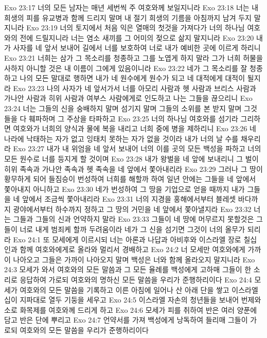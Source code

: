 Exo 23:17  너의 모든 남자는 매년 세번씩 주 여호와께 보일지니라
Exo 23:18  너는 내 희생의 피를 유교병과 함께 드리지 말며 내 절기 희생의 기름을 아침까지 남겨 두지 말지니라
Exo 23:19  너의 토지에서 처음 익은 열매의 첫것을 가져다가 너의 하나님 여호와의 전에 드릴지니라 너는 염소 새끼를 그 어미의 젖으로 삶지 말지니라
Exo 23:20  내가 사자를 네 앞서 보내어 길에서 너를 보호하여 너로 내가 예비한 곳에 이르게 하리니
Exo 23:21  너희는 삼가 그 목소리를 청종하고 그를 노엽게 하지 말라 그가 너희 허물을 사하지 아니할 것은 내 이름이 그에게 있음이니라
Exo 23:22  네가 그 목소리를 잘 청종하고 나의 모든 말대로 행하면 내가 네 원수에게 원수가 되고 네 대적에게 대적이 될지라
Exo 23:23  나의 사자가 네 앞서가서 너를 아모리 사람과 헷 사람과 브리스 사람과 가나안 사람과 히위 사람과 여부스 사람에게로 인도하고 나는 그들을 끊으리니
Exo 23:24  너는 그들의 신을 숭배하지 말며 섬기지 말며 그들의 소위를 본 받지 말며 그것들을 다 훼파하며 그 주상을 타파하고
Exo 23:25  너의 하나님 여호와를 섬기라 그리하면 여호와가 너희의 양식과 물에 복을 내리고 너희 중에 병을 제하리니
Exo 23:26  네 나라에 낙태하는 자가 없고 잉태치 못하는 자가 없을 것이라 내가 너의 날 수를 채우리라
Exo 23:27  내가 내 위엄을 네 앞서 보내어 너의 이를 곳의 모든 백성을 파하고 너의 모든 원수로 너를 등지게 할 것이며
Exo 23:28  내가 왕벌을 네 앞에 보내리니 그 벌이 히위 족속과 가나안 족속과 헷 족속을 네 앞에서 쫓아내리라
Exo 23:29  그러나 그 땅이 황무하게 되어 들짐승이 번성하여 너희를 해할까 하여 일년 안에는 그들을 네 앞에서 쫓아내지 아니하고
Exo 23:30  네가 번성하여 그 땅을 기업으로 얻을 때까지 내가 그들을 네 앞에서 조금씩 쫓아내리라
Exo 23:31  너의 지경을 홍해에서부터 블레셋 바다까지 광야에서부터 하수까지 정하고 그 땅의 거민을 네 앞에서 쫓아낼지라
Exo 23:32  너는 그들과 그들의 신과 언약하지 말라
Exo 23:33  그들이 네 땅에 머무르지 못할것은 그들이 너로 내게 범죄케 할까 두려움이라 네가 그 신을 섬기면 그것이 너의 올무가 되리라
Exo 24:1  또 모세에게 이르시되 너는 아론과 나답과 아비후와 이스라엘 장로 칠십인과 함께 여호와에게로 올라와 멀리서 경배하고
Exo 24:2  너 모세만 여호와에게 가까이 나아오고 그들은 가까이 나아오지 말며 백성은 너와 함께 올라오지 말지니라
Exo 24:3  모세가 와서 여호와의 모든 말씀과 그 모든 율례를 백성에게 고하매 그들이 한 소리로 응답하여 가로되 여호와의 명하신 모든 말씀을 우리가 준행하리이다
Exo 24:4  모세가 여호와의 모든 말씀을 기록하고 이른 아침에 일어나 산 아래 단을 쌓고 이스라엘 십이 지파대로 열두 기둥을 세우고
Exo 24:5  이스라엘 자손의 청년들을 보내어 번제와 소로 화목제를 여호와께 드리게 하고
Exo 24:6  모세가 피를 취하여 반은 여러 양푼에 담고 반은 단에 뿌리고
Exo 24:7  언약서를 가져 백성에게 낭독하여 들리매 그들이 가로되 여호와의 모든 말씀을 우리가 준행하리이다
